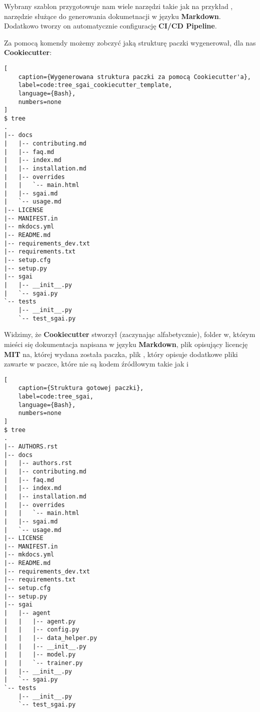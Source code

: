 Wybrany szablon przygotowuje nam wiele narzędzi takie jak na przykład , narzędzie służące do generowania dokumetnacji w języku \textbf{Markdown}.
Dodatkowo tworzy on automatycznie configurację \textbf{CI/CD Pipeline}.

\clearpage

Za pomocą komendy  możemy zobczyć jaką strukturę paczki wygenerował, dla nas \textbf{Cookiecutter}:

\begin{onepage}
    \begin{lstlisting}[
    caption={Wygenerowana struktura paczki za pomocą Cookiecutter'a},
    label=code:tree_sgai_cookiecutter_template,
    language={Bash},
    numbers=none
]
$ tree
.
|-- docs
|   |-- contributing.md
|   |-- faq.md
|   |-- index.md
|   |-- installation.md
|   |-- overrides
|   |   `-- main.html
|   |-- sgai.md
|   `-- usage.md
|-- LICENSE
|-- MANIFEST.in
|-- mkdocs.yml
|-- README.md
|-- requirements_dev.txt
|-- requirements.txt
|-- setup.cfg
|-- setup.py
|-- sgai
|   |-- __init__.py
|   `-- sgai.py
`-- tests
    |-- __init__.py
    `-- test_sgai.py
    \end{lstlisting}
\end{onepage}


Widzimy, że \textbf{Cookiecutter} stworzył (zaczynając alfabetycznie), folder  w, którym mieści się dokumentacja napisana w języku \textbf{Markdown}, plik  opisujący licencję \textbf{MIT} na, której wydana została paczka, plik , który opisuje dodatkowe pliki zawarte w paczce, które nie są kodem źródłowym takie jak  i 




\begin{onepage}
    \begin{lstlisting}[
    caption={Struktura gotowej paczki},
    label=code:tree_sgai,
    language={Bash},
    numbers=none
]
$ tree
.
|-- AUTHORS.rst
|-- docs
|   |-- authors.rst
|   |-- contributing.md
|   |-- faq.md
|   |-- index.md
|   |-- installation.md
|   |-- overrides
|   |   `-- main.html
|   |-- sgai.md
|   `-- usage.md
|-- LICENSE
|-- MANIFEST.in
|-- mkdocs.yml
|-- README.md
|-- requirements_dev.txt
|-- requirements.txt
|-- setup.cfg
|-- setup.py
|-- sgai
|   |-- agent
|   |   |-- agent.py
|   |   |-- config.py
|   |   |-- data_helper.py
|   |   |-- __init__.py
|   |   |-- model.py
|   |   `-- trainer.py
|   |-- __init__.py
|   `-- sgai.py
`-- tests
    |-- __init__.py
    `-- test_sgai.py
    \end{lstlisting}
\end{onepage}





